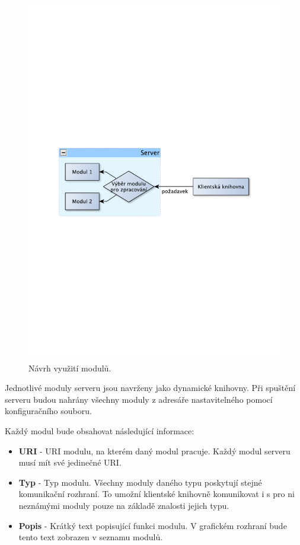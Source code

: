 \begin{figure}[h]
\centering
\includegraphics[trim=11cm 11cm 11cm 11cm, scale=0.7]{fig/navrh_moduly}
\caption{Návrh využití modulů.}
\label{fig:navrh_moduly}
\end{figure}

Jednotlivé moduly serveru jsou navrženy jako dynamické knihovny.
Při spuštění serveru budou nahrány všechny moduly z adresáře nastavitelného pomocí konfiguračního souboru.

Každý modul bude obsahovat následující informace:

\begin{itemize}
\item \textbf{URI} - URI modulu, na kterém daný modul pracuje. Každý modul serveru musí mít své jedinečné URI.
\item \textbf{Typ} - Typ modulu. Všechny moduly daného typu poskytují stejné komunikační rozhraní. To umožní klientské knihovně
komunikovat i s pro ni neznámými moduly pouze na základě znalosti jejich typu.
\item \textbf{Popis} - Krátký text popisující funkci modulu. V grafickém rozhraní bude tento text zobrazen v seznamu modulů.
\end{itemize}

